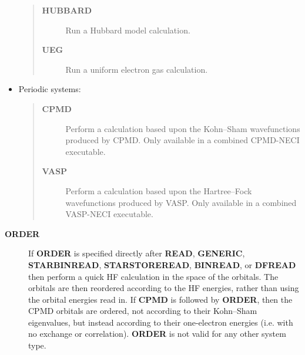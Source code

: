 \documentclass[openany,a4paper,10pt]{manual}
\begin{document}
\begin{itemize}
\begin{quote}
\begin{description}
\item[\textbf{HUBBARD}]
Run a Hubbard model calculation.

\item[\textbf{UEG}]
Run a uniform electron gas calculation.

\end{description}
\end{quote}

\item {} 
Periodic systems:
\begin{quote}
\begin{description}
\item[\textbf{CPMD}]
Perform a calculation based upon the Kohn--Sham wavefunctions
produced by CPMD.  Only available in a combined CPMD-NECI
executable.

\item[\textbf{VASP}]
Perform a calculation based upon the Hartree--Fock wavefunctions
produced by VASP.  Only available in a combined VASP-NECI
executable.

\end{description}
\end{quote}

\end{itemize}
\begin{description}
\item[\textbf{ORDER}]
If \textbf{ORDER} is specified directly after \textbf{READ}, \textbf{GENERIC},
\textbf{STARBINREAD}, \textbf{STARSTOREREAD}, \textbf{BINREAD}, or \textbf{DFREAD} then
perform a quick HF calculation in the space of the orbitals.
The orbitals are then reordered according to the HF energies,
rather than using the orbital energies read in.  If \textbf{CPMD} is followed
by \textbf{ORDER}, then the CPMD orbitals are ordered, not according to their
Kohn--Sham eigenvalues, but instead according to their one-electron energies
(i.e. with no exchange or correlation).  \textbf{ORDER} is not valid for any
other system type.

\end{description}
\end{document}
